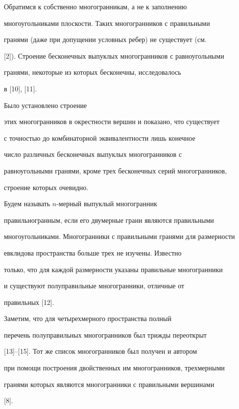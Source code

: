  


Обратимся к собственно многогранникам, а не к заполнению 


многоугольниками плоскости. Таких многогранников с правильными 


гранями (даже при допущении условных ребер) не существует (см.  


[2]). Строение бесконечных выпуклых многогранников с равноугольными 


гранями, некоторые из которых бесконечны, исследовалось 


в [10], [11]. 


Было установлено строение 


этих многогранников в окрестности вершин и показано, что существует 


с точностью до комбинаторной эквивалентности лишь конечное 


число различных бесконечных выпуклых многогранников с 


равноугольными гранями, кроме трех бесконечных серий многогранников, 


строение которых очевидно. 


 


Будем называть $n$-мерный выпуклый многогранник 


правильногранным, если его двумерные грани являются правильными 


многоугольниками. Многогранники с правильными гранями для размерности 


евклидова пространства больше трех не изучены. Известно 


только, что для каждой размерности указаны правильные многогранники 


и существуют полуправильные многогранники, отличные от 


правильных [12]. 


 


Заметим, что для четырехмерного пространства полный 


перечень полуправильных многогранников был трижды переоткрыт 


[13]--[15]. Тот же список многогранников был получен и автором 


при помощи построения двойственных им многогранников, трехмерными 


гранями которых являются многогранники с правильными вершинами 


[8]. 


